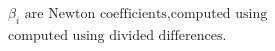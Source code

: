 \documentclass[preview]{standalone}
\begin{document}
\begin{align*}
\beta_i \text{ are Newton coefficients,computed using } \\ \text{computed using divided differences.}
\end{align*}
\end{document}
